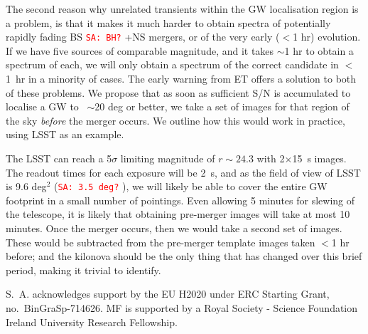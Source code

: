 \documentclass{aa}
\newcommand{\sa}[1]{{\textcolor{red}{\texttt{SA: #1}} }}
\begin{document}
The second reason why unrelated transients within the GW localisation region  is a problem, is that it makes it much harder to obtain spectra of potentially rapidly fading BS \sa{BH?}+NS mergers, or of the very early ($<$1 hr) evolution. If we have five sources of comparable magnitude, and it takes $\sim$1 hr to obtain a spectrum of each, we will only obtain a spectrum of the correct candidate in $<$1~hr in a minority of cases.
The early warning from ET offers a solution to both of these problems. We propose that as soon as sufficient S/N is accumulated to localise a GW to ~$\sim$20 deg or better, we take a set of images for that region of the sky {\it before} the merger occurs.
We outline how this would work in practice, using LSST as an example.

The LSST can reach a 5$\sigma$ limiting magnitude of $r\sim24.3$ with 2$\times$15~s images. The readout times for each exposure will be 2~s, and as the field of view of LSST is 9.6 deg$^2$ (\sa{3.5 deg?}), we will likely be able to cover the entire GW footprint in a small number of pointings. Even allowing 5 minutes for slewing of the telescope, it is likely that obtaining pre-merger images will take at most 10 minutes.
Once the merger occurs, then we would take a second set of images. These would be subtracted from the pre-merger template images taken $<$1 hr before; and the kilonova should be the only thing that has changed over this brief period, making it trivial to identify.



\begin{acknowledgements}
 S.~A. acknowledges support by the EU H2020 under ERC Starting Grant, no.~BinGraSp-714626.
 MF is supported by a Royal Society - Science Foundation Ireland University Research Fellowship.
\end{acknowledgements}




\end{document}

